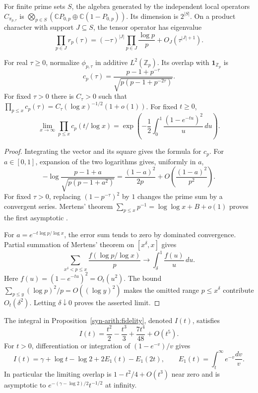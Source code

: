 For finite prime sets $S$, the algebra generated by the independent local
operators $C_{\pi_{p,\tau}}$ is
$\bigotimes_{p\in S}(\mathbb CP_{0,p}\oplus\mathbb C(1-P_{0,p}))$.
Its dimension is $2^{|S|}$.
On a product character with support $J\subseteq S$, the tensor operator has eigenvalue
\[
 \prod_{p\in J}r_p(\tau)
 =(-\tau)^{|J|}\prod_{p\in J}\frac{\log p}{p}
   +O_J(\tau^{|J|+1}).
\]

\begin{proposition}
\label{syn-arith:fidelity}
For real $\tau\geq0$, normalize $\phi_{p,\tau}$ in additive $L^2(\mathbb Z_p)$.
Its overlap with $\mathbf1_{\mathbb Z_p}$ is
\[
 c_p(\tau)=\frac{p-1+p^{-\tau}}
                 {\sqrt{p(p-1+p^{-2\tau})}}.
\]
For fixed $\tau>0$ there is $C_\tau>0$ such that
$\prod_{p\leq x}c_p(\tau)=C_\tau(\log x)^{-1/2}(1+o(1))$.
For fixed $t\geq0$,
\[
 \lim_{x\to\infty}\prod_{p\leq x}c_p(t/\log x)
 =\exp\left(-\frac12\int_0^1\frac{(1-e^{-tu})^2}{u}\,du\right).
\]
\end{proposition}
\begin{proof}
Integrating the vector and its square gives the formula for $c_p$.
For $a\in[0,1]$, expansion of the two logarithms gives, uniformly in $a$,
\[
 -\log\frac{p-1+a}{\sqrt{p(p-1+a^2)}}
 =\frac{(1-a)^2}{2p}+O\left(\frac{(1-a)^2}{p^2}\right).
\]
For fixed $\tau>0$, replacing $(1-p^{-\tau})^2$ by $1$ changes the prime sum
by a convergent series.  Mertens' theorem
$\sum_{p\leq x}p^{-1}=\log\log x+B+o(1)$ proves the first asymptotic
\cite{syn-arith:Mertens}.

For $a=e^{-t\log p/\log x}$, the error sum tends to zero by dominated convergence.
Partial summation of Mertens' theorem on $[x^\delta,x]$ gives
\[
 \sum_{x^\delta<p\leq x}\frac{f(\log p/\log x)}p
 \longrightarrow\int_\delta^1\frac{f(u)}u\,du.
\]
Here $f(u)=(1-e^{-tu})^2=O_t(u^2)$.
The bound $\sum_{p\leq y}(\log p)^2/p=O((\log y)^2)$ makes the omitted range
$p\leq x^\delta$ contribute $O_t(\delta^2)$.
Letting $\delta\downarrow0$ proves the asserted limit.
\end{proof}

The integral in Proposition~\ref{syn-arith:fidelity}, denoted $I(t)$, satisfies
\[
 I(t)=\frac{t^2}{2}-\frac{t^3}{3}+\frac{7t^4}{48}+O(t^5).
\]
For $t>0$, differentiation or integration of $(1-e^{-v})/v$ gives
\[
 I(t)=\gamma+\log t-\log2+2E_1(t)-E_1(2t),
 \qquad E_1(t)=\int_t^\infty e^{-v}\frac{dv}{v}.
\]
In particular the limiting overlap is $1-t^2/4+O(t^3)$ near zero
and is asymptotic to $e^{-(\gamma-\log2)/2}t^{-1/2}$ at infinity.

